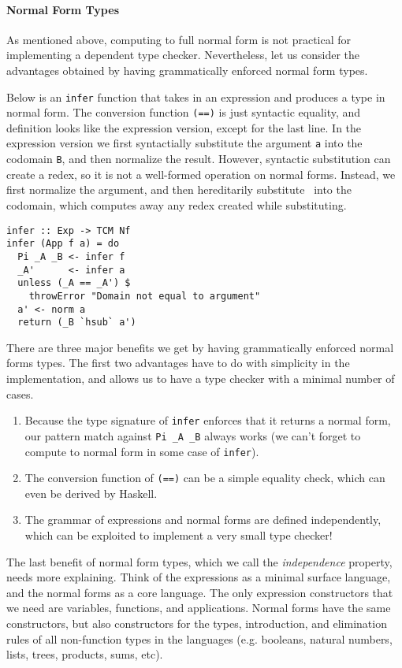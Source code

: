 \documentclass[preprint,authoryear]{sigplanconf}
\begin{document}
\paragraph{Normal Form Types}

As mentioned above, computing to full normal form is not practical for
implementing a dependent type checker. Nevertheless, let us consider
the advantages obtained by having grammatically enforced normal form
types.

Below is an \texttt{infer} function that takes in an expression
and produces a type in normal form. The conversion function
\texttt{(==)} is just syntactic equality, and definition looks like
the expression version, except for the last line. In the expression
version we first syntactially substitute the argument \texttt{a} into
the codomain \texttt{B}, and then normalize the result. However,
syntactic substitution can create a redex, so it is not a well-formed
operation on normal forms. Instead, we first normalize the argument,
and then hereditarily substitute~\cite{TODO} into the codomain, which
computes away any redex created while substituting.

\begin{verbatim}
infer :: Exp -> TCM Nf
infer (App f a) = do
  Pi _A _B <- infer f
  _A'      <- infer a
  unless (_A == _A') $
    throwError "Domain not equal to argument"
  a' <- norm a
  return (_B `hsub` a')
\end{verbatim}

There are three major benefits we get by having grammatically enforced
normal forms types. The first two advantages have to do with
simplicity in the implementation, and allows us to have a type checker
with a minimal number of cases.

\begin{enumerate}
\item Because the type signature of \texttt{infer} enforces that it
  returns a normal form, our pattern match against \texttt{Pi \_A \_B}
  always works (we can't forget to compute to normal form in some case
  of \texttt{infer}).
\item The conversion function of \texttt{(==)} can be a simple
  equality check, which can even be derived by Haskell.
\item The grammar of expressions and normal forms are defined
  independently, which can be exploited to implement a very small type
  checker!
\end{enumerate}

The last benefit of normal form types, which we call the
 {\it independence} property, needs more explaining. Think of
the expressions as a minimal surface language, and the
normal forms as a core language. The only expression constructors that we
need are variables, functions, and applications. Normal forms have the
same constructors, but also constructors for the types, introduction,
and elimination rules of all non-function types in the languages (e.g.
booleans, natural numbers, lists, trees, products, sums, etc).
\end{document}
